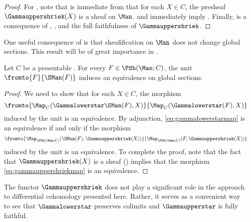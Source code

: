 \begin{proof}
	For , note that is immediate from  that for each $ X \in C $, the presheaf $ \Gammauppershriek(X) $ is a sheaf on $ \Man $.
	 and  immediately imply .
	Finally,  is a consequence of , , and the full faithfulness of $ \Gammauppershriek $.
\end{proof}

One useful consequence of  is that sheafification on $ \Man $ does not change global sections.
This result will be of great importance in .

\begin{corollary}\label{cor:sheafificationofglobalsections}
	Let $ C $ be a presentable \category.
	For every $ F \in \PSh(\Man;C) $, the unit $ \fromto{F}{\SMan(F)} $ induces an equivalence on global sections.  
\end{corollary}

\begin{proof}
	We need to show that for each $ X \in C $, the morphism
	\begin{equation}\label{eq:gammalowerstarmap}
		\fromto{\Map_C(\Gammalowerstar\SMan(F),X)}{\Map_C(\Gammalowerstar(F),X)}
	\end{equation}
	induced by the unit is an equivalence.
	By adjunction, \eqref{eq:gammalowerstarmap} is an equivalence if and only if the 
	morphism 
	\begin{equation}\label{eq:gammauppershriekmap}
		\fromto{\Map_{\PSh(\Man;C)}(\SMan(F),\Gammauppershriek(X))}{\Map_{\PSh(\Man;C)}(F,\Gammauppershriek(X))}
	\end{equation}
	induced by the unit is an equivalence.
	To complete the proof, note that the fact that $ \Gammauppershriek(X) $ is a sheaf () implies that the morphism \eqref{eq:gammauppershriekmap} is an equivalence.
\end{proof}

\begin{remark}
	The functor $ \Gammauppershriek $ does not play a significant role in the approach to differential cohomology presented here.
	Rather, it serves as a convenient way to see that $ \Gammalowerstar $ preserves colimits and $ \Gammaupperstar $ is fully faithful.
\end{remark}

